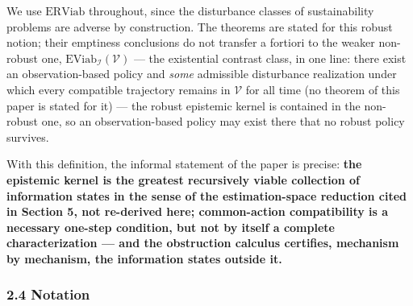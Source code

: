 \documentclass[11pt]{article}
\begin{document}
We use \(\mathrm{ERViab}\) throughout, since the disturbance classes of
sustainability problems are adverse by construction. The theorems are
stated for this robust notion; their emptiness conclusions do not
transfer a fortiori to the weaker non-robust one,
\(\mathrm{EViab}_{\mathcal{I}}(\mathcal{V})\) --- the existential
contrast class, in one line: there exist an observation-based policy and
\emph{some} admissible disturbance realization under which every
compatible trajectory remains in \(\mathcal{V}\) for all time (no
theorem of this paper is stated for it) --- the robust epistemic kernel
is contained in the non-robust one, so an observation-based policy may
exist there that no robust policy survives.

With this definition, the informal statement of the paper is precise:
\textbf{the epistemic kernel is the greatest recursively viable
collection of information states in the sense of the estimation-space
reduction cited in Section 5, not re-derived here; common-action
compatibility is a necessary one-step condition, but not by itself a
complete characterization --- and the obstruction calculus certifies,
mechanism by mechanism, the information states outside it.}

\subsubsection{2.4 Notation}\label{notation}
\end{document}
